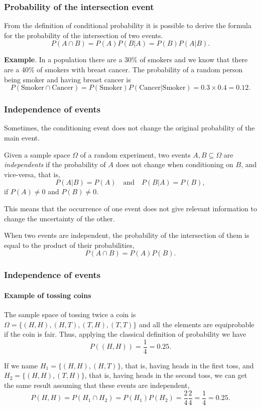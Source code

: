 \begin{frame}
\frametitle{Probability of the intersection event}
From the definition of conditional probability it is possible to derive the formula for the probability of the intersection of two events. 
\[
P(A\cap B) = P(A)P(B|A) = P(B)P(A|B).
\]

\textbf{Example}. In a population there are a 30\% of smokers and we know that there are a 40\% of smokers with breast cancer. 
The probability of a random person being smoker and having breast cancer is 
\[
P(\mbox{Smoker}\cap \mbox{Cancer})= P(\mbox{Smoker})P(\mbox{Cancer}|\mbox{Smoker}) =
0.3\times 0.4 = 0.12.
\]
\end{frame}


\begin{frame}
\frametitle{Independence of events}
Sometimes, the conditioning event does not change the original probability of the main event. 
\begin{definition}
Given a sample space $\Omega$ of a random experiment, two events $A,B\subseteq \Omega$ are \emph{independents} if the probability of $A$ does not change when conditioning on $B$, and vice-versa, that is,
\[
P(A|B) = P(A) \quad \mbox{and} \quad P(B|A)=P(B),
\]
if $P(A)\neq 0$ and $P(B)\neq 0$.
\end{definition}

This means that the occurrence of one event does not give relevant information to change the uncertainty of the other.

When two events are independent, the probability of the intersection of them is equal to the product of their probabilities,
\[
P(A\cap B) = P(A)P(B).
\]
\end{frame}


\begin{frame}
\frametitle{Independence of events}
\framesubtitle{Example of tossing coins}
The sample space of tossing twice a coin is $\Omega=\{(H,H),(H,T),(T,H),(T,T)\}$ and all the elements are equiprobable if the coin is fair. 
Thus, applying the classical definition of probability we have 
\[
P((H,H)) = \frac{1}{4} = 0.25.
\]

If we name $H_1=\{(H,H),(H,T)\}$, that is, having heads in the first toss, and $H_2=\{(H,H),(T,H)\}$, that is, having
heads in the second toss, we can get the same result assuming that these events are independent,
\[
P(H,H)= P(H_1\cap H_2) = P(H_1)P(H_2) = \frac{2}{4}\frac{2}{4}=\frac{1}{4}=0.25.
\] 
\end{frame}


